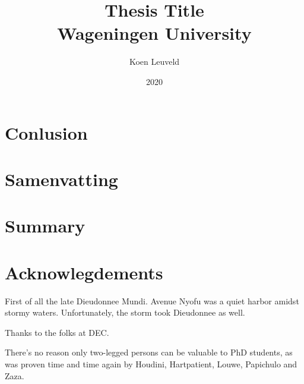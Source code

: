 \documentclass[12pt]{report}
\begin{document}

\title{
	{Thesis Title}\\
	{\large Wageningen University}\\
}
\author{Koen Leuveld}
\date{2020}
\maketitle



\tableofcontents




 



\chapter{Conlusion}


\clearpage
\chapter{Samenvatting}


\clearpage
\chapter{Summary}



\chapter{Acknowlegdements}
First of all the late Dieudonnee Mundi. Avenue Nyofu was a quiet harbor amidst stormy waters. Unfortunately, the storm took Dieudonnee as well.

Thanks to the folks at DEC.


There's no reason only two-legged persons can be valuable to PhD students, as was proven time and time again by Houdini, Hartpatient, Louwe, Papichulo and Zaza.




\end{document}
